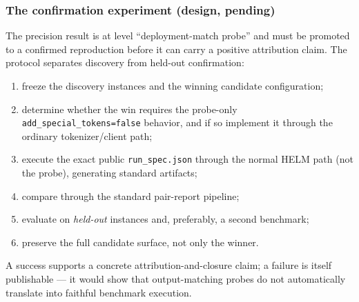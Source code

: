\subsubsection{The confirmation experiment (design, pending)}
\label{sec:olmo-confirm}

The precision result is at level ``deployment-match probe'' and must be promoted
to a confirmed reproduction before it can carry a positive attribution claim. The
protocol separates discovery from held-out confirmation:
\begin{enumerate}[nosep,leftmargin=1.6em]
  \item freeze the discovery instances and the winning candidate configuration;
  \item determine whether the win requires the probe-only
        \texttt{add\_special\_tokens=false} behavior, and if so implement it through
        the ordinary tokenizer/client path;
  \item execute the exact public \texttt{run\_spec.json} through the normal HELM
        path (not the probe), generating standard artifacts;
  \item compare through the standard pair-report pipeline;
  \item evaluate on \emph{held-out} instances and, preferably, a second benchmark;
  \item preserve the full candidate surface, not only the winner.
\end{enumerate}
A success supports a concrete attribution-and-closure claim; a failure is itself
publishable --- it would show that output-matching probes do not automatically
translate into faithful benchmark execution.
\par\smallskip\noindent{}\par\smallskip

